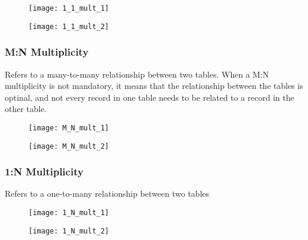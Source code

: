 \begin{minipage}{0.45\textwidth}
\begin{figure}[H]
    \centering
    \texttt{[image: 1\_1\_mult\_1]}
\end{figure}
\end{minipage}
\hfill
\begin{minipage}{0.45\textwidth}
\begin{figure}[H]
    \centering
    \texttt{[image: 1\_1\_mult\_2]}
\end{figure}
\end{minipage}


\subsubsection{M:N Multiplicity}

Refers to a many-to-many relationship between two tables. When a M:N multiplicity is not mandatory, it means that the relationship between the tables is optinal, and not every record in one table needs to be related to a record in the other table.

\begin{minipage}{0.45\textwidth}
\begin{figure}[H]
    \centering
    \texttt{[image: M\_N\_mult\_1]}
\end{figure}
\end{minipage}
\hfill
\begin{minipage}{0.45\textwidth}
\begin{figure}[H]
    \centering
    \texttt{[image: M\_N\_mult\_2]}
\end{figure}
\end{minipage}

\subsubsection{1:N Multiplicity}

Refers to a one-to-many relationship between two tables

\begin{minipage}{0.45\textwidth}
\begin{figure}[H]
    \centering
    \texttt{[image: 1\_N\_mult\_1]}
\end{figure}
\end{minipage}
\hfill
\begin{minipage}{0.45\textwidth}
\begin{figure}[H]
    \centering
    \texttt{[image: 1\_N\_mult\_2]}
\end{figure}
\end{minipage}

